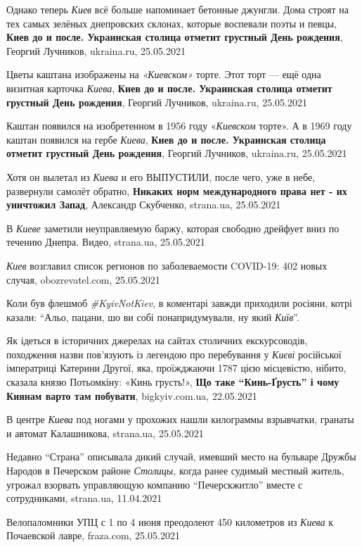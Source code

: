 Однако теперь \emph{Киев} всё больше напоминает бетонные джунгли. Дома строят на тех
самых зелёных днепровских склонах, которые воспевали поэты и певцы,
\textbf{Киев до и после. Украинская столица отметит грустный День рождения}, Георгий Лучников, ukraina.ru, 25.05.2021

Цветы каштана изображены на \emph{«Киевском»} торте. Этот торт — ещё одна визитная
карточка \emph{Киева}, \textbf{Киев до и после. Украинская столица отметит грустный
День рождения}, Георгий Лучников, ukraina.ru, 25.05.2021

Каштан появился на изобретенном в 1956 году «\emph{Киевском} торте». А в 1969 году каштан появился на гербе \emph{Киева},
\textbf{Киев до и после. Украинская столица отметит грустный День рождения}, Георгий Лучников, ukraina.ru, 25.05.2021

Хотя он вылетал из \emph{Киева} и его ВЫПУСТИЛИ, после чего, уже в небе,
развернули самолёт обратно, \textbf{Никаких норм международного права нет - их
уничтожил Запад}, Александр Скубченко, strana.ua, 25.05.2021

В \emph{Киеве} заметили неуправляемую баржу, которая свободно дрейфует вниз по
течению Днепра. Видео, strana.ua, 25.05.2021

\emph{Киев} возглавил список регионов по заболеваемости COVID-19: 402 новых
случая, obozrevatel.com, 25.05.2021

Коли був флешмоб \emph{\#KyivNotKiev}, в коментарі завжди приходили росіяни,
котрі казали: \enquote{Альо, пацани, шо ви собі понапридумували, ну який
\emph{Київ}}. 

Як ідеться в історичних джерелах на сайтах столичних екскурсоводів, походження
назви пов’язують із легендою про перебування у \emph{Києві} російської
імператриці Катерини Другої, яка, проїжджаючи 1787 цією місцевістю, нібито,
сказала князю Потьомкіну: «Кинь грусть!», \textbf{Що таке \enquote{Кинь-Ґрусть}
і чому Киянам варто там побувати}, bigkyiv.com.ua, 22.05.2021

В центре \emph{Киева} под ногами у прохожих нашли килограммы взрывчатки,
гранаты и автомат Калашникова, strana.ua, 25.05.2021

Недавно \enquote{Страна} описывала дикий случай, имевший место на бульваре
Дружбы Народов в Печерском районе \emph{Столицы}, когда ранее судимый местный
житель, угрожал взорвать управляющую компанию \enquote{Печерскжитло} вместе с
сотрудниками, strana.ua, 11.04.2021

Велопаломники УПЦ с 1 по 4 июня преодолеют 450 километров из \emph{Киева} к
Почаевской лавре, fraza.com, 25.05.2021

